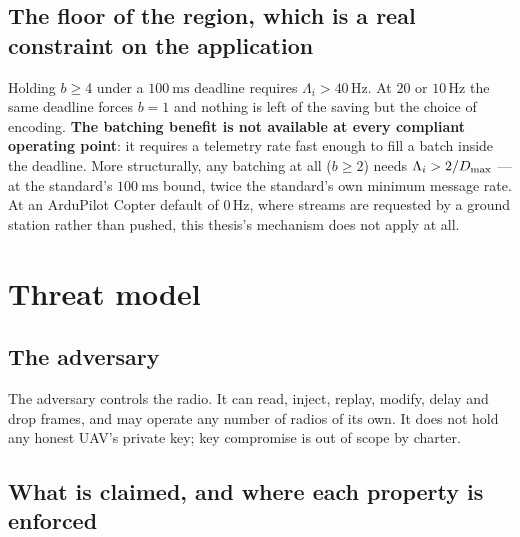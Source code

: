 \subsection{The floor of the region, which is a real constraint on the application}

Holding $b \geq 4$ under a $\SI{100}{\milli\second}$ deadline requires $\Lambda_i > 40$\,Hz. At
$20$ or $10$\,Hz the same deadline forces $b = 1$ and nothing is left of the saving but the
choice of encoding. \textbf{The batching benefit is not available at every compliant operating
point}: it
requires a telemetry rate fast enough to fill a batch inside the deadline. More structurally, any
batching at all ($b \geq 2$) needs $\Lambda_i > 2/D_{\max}$ --- at the standard's
$\SI{100}{\milli\second}$ bound, twice the standard's own minimum message rate. At an ArduPilot Copter default of $0$\,Hz,
where streams are requested by a ground station rather than pushed, this thesis's mechanism does
not apply at all.

\section{Threat model}\label{sec:threat}

\subsection{The adversary}

The adversary controls the radio. It can read, inject, replay, modify, delay and drop frames, and
may operate any number of radios of its own. It does not hold any honest UAV's private key; key
compromise is out of scope by charter.

\subsection{What is claimed, and where each property is enforced}

